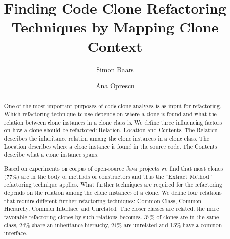 \documentclass[runningheads]{llncs}
\begin{document}
%
\title{Finding Code Clone Refactoring Techniques by Mapping Clone Context}
%
%
\author{Simon Baars \and
Ana Oprescu}
%
%
%
\maketitle              %
%
\begin{abstract}
One of the most important purposes of code clone analyses is as input for refactoring. Which refactoring technique to use depends on where a clone is found and what the relation between clone instances in a clone class is. We define three influencing factors on how a clone should be refactored: Relation, Location and Contents. The Relation describes the inheritance relation among the clone instances in a clone class. The Location describes where a clone instance is found in the source code. The Contents describe what a clone instance spans.

Based on experiments on corpus of open-source Java projects we find that most clones (77\%) are in the body of methods or constructors and thus the ``Extract Method'' refactoring technique applies. What further techniques are required for the refactoring depends on the relation among the clone instances of a clone. We define four relations that require different further refactoring techniques: Common Class, Common Hierarchy, Common Interface and Unrelated. %
The closer classes are related, the more favorable refactoring clones by such relations becomes. 37\% of clones are in the same class, 24\% share an inheritance hierarchy, 24\% are unrelated and 15\% have a common interface.%


\end{abstract}
%
%
%
\end{document}
